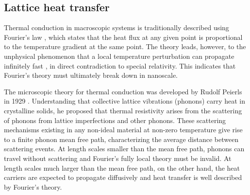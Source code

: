 \subsection{Lattice heat transfer}



Thermal conduction in macroscopic systems is traditionally described using Fourier's law \cite{}, which states that the heat flux at any given point is proportional to the temperature gradient at the same point. The theory leads, however, to the unphysical phenomenon that a local temperature perturbation can propagate infinitely fast \cite{chen}, in direct contradiction to special relativity. This indicates that Fourier's theory must ultimately break down in nanoscale.

The microscopic theory for thermal conduction was developed by Rudolf Peierls in 1929 \cite{}. Understanding that collective lattice vibrations (phonons) carry heat in crystalline solids, he proposed that thermal resistivity arises from the scattering of phonons from lattice imperfections and other phonons. These scattering mechanisms existing in any non-ideal material at non-zero temperature give rise to a finite phonon mean free path, characterizing the average distance between scattering events. At length scales smaller than the mean free path, phonons can travel without scattering and Fourier's fully local theory must be invalid. At length scales much larger than the mean free path, on the other hand, the heat carriers are expected to propagate diffusively and heat transfer is well described by Fourier's theory.

